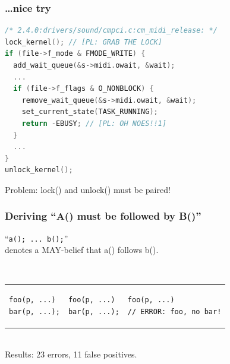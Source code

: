 \documentclass{beamer}
\newenvironment{changemargin}[1]{%
  \begin{list}{}{%
    \setlength{\topsep}{0pt}%
    \setlength{\leftmargin}{#1}%
    \setlength{\rightmargin}{1em}
    \setlength{\listparindent}{\parindent}%
    \setlength{\itemindent}{\parindent}%
    \setlength{\parsep}{\parskip}%
  }%
  \item[]}{\end{list}}
\begin{document}
\begin{frame}[fragile]
  \frametitle{\ldots nice try}
    \begin{lstlisting}[language=C,commentstyle={\color{red}\bf}]
/* 2.4.0:drivers/sound/cmpci.c:cm_midi_release: */
lock_kernel(); // [PL: GRAB THE LOCK]
if (file->f_mode & FMODE_WRITE) {
  add_wait_queue(&s->midi.owait, &wait);
  ...
  if (file->f_flags & O_NONBLOCK) {
    remove_wait_queue(&s->midi.owait, &wait);
    set_current_state(TASK_RUNNING);
    return -EBUSY; // [PL: OH NOES!!1]
  }
  ...
}
unlock_kernel();
    \end{lstlisting}
    \begin{changemargin}{1cm}
      \Large
      Problem: lock() and unlock() must be paired!
  \end{changemargin}
\end{frame}

\begin{frame}[fragile]
  \frametitle{Deriving ``A() must be followed by B()''}
      \begin{changemargin}{1cm}
        ``{\tt a(); ... b();}'' \\
        denotes a MAY-belief that a() follows b().
      \end{changemargin}

~\\[1em]
      \begin{tabular}{l|l|l}
        \begin{minipage}{.24\textwidth}
          \begin{lstlisting}
foo(p, ...)
bar(p, ...);
          \end{lstlisting}
        \end{minipage} &
        \begin{minipage}{.24\textwidth}
          \begin{lstlisting}
foo(p, ...)
bar(p, ...);
          \end{lstlisting}
        \end{minipage} &
        \begin{minipage}{.5\textwidth}
          \begin{lstlisting}
foo(p, ...)
// ERROR: foo, no bar!
          \end{lstlisting}
        \end{minipage} 
      \end{tabular}
      \begin{changemargin}{1cm}~\\[1em]
        Results: 23 errors, 11 false positives.
      \end{changemargin}
\end{frame}
\end{document}
